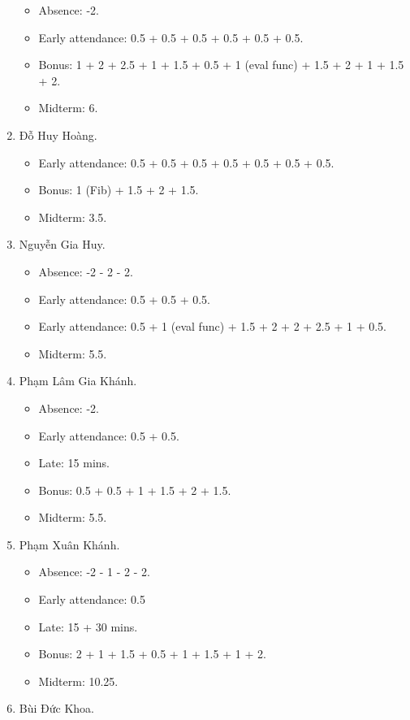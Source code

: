 \documentclass{article}
\begin{document}
\begin{enumerate}
	\begin{itemize}
        \item Absence: -2.
		\item Early attendance: 0.5 + 0.5 + 0.5 + 0.5 + 0.5 + 0.5.
		\item Bonus: 1 + 2 + 2.5 + 1 + 1.5 + 0.5 + 1 (eval func) + 1.5 + 2 + 1 + 1.5 + 2.
        \item Midterm: 6.
	\end{itemize}
	\item {\sc Đỗ Huy Hoàng.}
	\begin{itemize}
		\item Early attendance: 0.5 + 0.5 + 0.5 + 0.5 + 0.5 + 0.5  + 0.5.
		\item Bonus: 1 (Fib) + 1.5 + 2 + 1.5.
        \item Midterm: 3.5.
	\end{itemize}
	\item {\sc Nguyễn Gia Huy.}
	\begin{itemize}
		\item Absence: -2 - 2 - 2.
        \item Early attendance: 0.5 + 0.5 + 0.5.
		\item Early attendance: 0.5 + 1 (eval func) + 1.5 + 2 + 2 + 2.5 + 1 + 0.5.
        \item Midterm: 5.5.
	\end{itemize}
	\item {\sc Phạm Lâm Gia Khánh.}
	\begin{itemize}
		\item Absence: -2.
        \item Early attendance: 0.5 + 0.5.
		\item Late: 15 mins.
		\item Bonus: 0.5 + 0.5 + 1 + 1.5 + 2 + 1.5.
        \item Midterm: 5.5.
	\end{itemize}
	\item {\sc Phạm Xuân Khánh.}
	\begin{itemize}
		\item Absence: -2 - 1 - 2 - 2.
		\item Early attendance: 0.5
		\item Late: 15 + 30 mins.
		\item Bonus: 2 + 1 + 1.5 + 0.5 + 1 + 1.5 + 1 + 2.
        \item Midterm: 10.25.
	\end{itemize}
	\item {\sc Bùi Đức Khoa.}
	\begin{itemize}

\end{itemize}
\end{enumerate}
\end{document}

